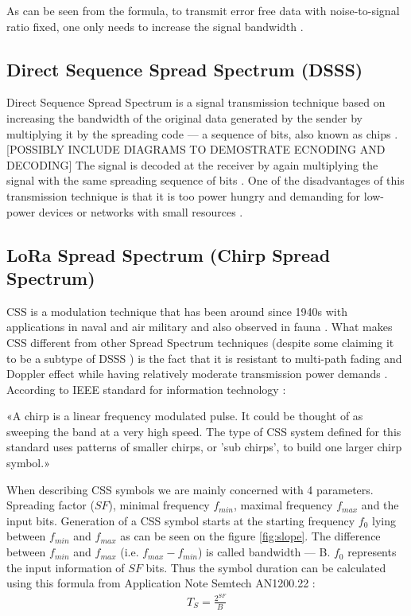 As can be seen from the formula, to transmit error free data with noise-to-signal ratio fixed, one only needs to increase the signal bandwidth \cite{semtech_spec}.

\subsection{Direct Sequence Spread Spectrum (DSSS)}

Direct Sequence Spread Spectrum is a signal transmission technique based on increasing the bandwidth of the original data generated by the sender by multiplying it by the spreading code — a sequence of bits, also known as chips \cite{dsss_article}. [POSSIBLY INCLUDE DIAGRAMS TO DEMOSTRATE ECNODING AND DECODING] The signal is decoded at the receiver by again multiplying the signal with
the same spreading sequence of bits \cite{dsss_article}. One of the disadvantages of this transmission technique is that it is too power hungry and demanding for low-power devices or networks with small resources \cite{semtech_spec}.

\subsection{LoRa Spread Spectrum (Chirp Spread Spectrum)}

CSS is a modulation technique that has been around since 1940s \cite{semtech_spec} with 
applications in naval and air military and also observed in fauna \cite{origins}. What makes CSS different from other Spread Spectrum techniques (despite some claiming it to be a subtype of DSSS \cite{orthogonality_description}) is the fact that it is resistant to multi-path fading and Doppler effect while having relatively moderate transmission power demands \cite{semtech_spec}. \\

According to IEEE standard for information technology \cite{ieee_2007}: \\

\begin{addmargin}[4em]{2em}%
«A chirp is a linear frequency modulated pulse. It could be thought of as sweeping the band at a very high speed. The type of CSS system defined for this standard uses patterns of smaller chirps, or ’sub chirps’, to build one larger chirp symbol.» \\
\end{addmargin}

When describing CSS symbols we are mainly concerned with 4 parameters. 
Spreading factor ($SF$), minimal frequency $f_{min}$, maximal frequency $f_{max}$ and the input bits. Generation of a CSS symbol starts at the starting frequency $f_0$ lying between $f_{min}$ and $f_{max}$ as can be seen on the figure \ref{fig:slope}. The difference between $f_{min}$ and $f_{max}$ (i.e. $f_{max} - f_{min}$) is called bandwidth — B. $f_0$ represents the input information of $SF$ bits. Thus the symbol duration can be calculated using this formula from Application Note Semtech AN1200.22 \cite{semtech_spec}: 
\begin{align}
    T_S = \frac{2^{SF}}{B} 
\end{align}

